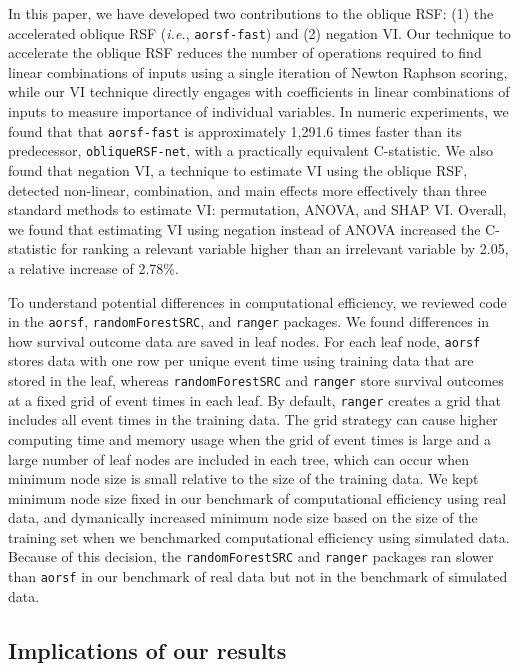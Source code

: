 \documentclass[12pt]{article}\usepackage[]{graphicx}\usepackage[]{xcolor}
\newcommand{\ie}{\textit{i.e.}}
\begin{document}
In this paper, we have developed two contributions to the oblique RSF: (1) the accelerated oblique RSF (\ie, \texttt{aorsf-fast}) and (2) negation VI. Our technique to accelerate the oblique RSF reduces the number of operations required to find linear combinations of inputs using a single iteration of Newton Raphson scoring, while our VI technique directly engages with coefficients in linear combinations of inputs to measure importance of individual variables. In numeric experiments, we found that that \texttt{aorsf-fast} is approximately 1,291.6 times faster than its predecessor, \texttt{obliqueRSF-net}, with a practically equivalent C-statistic. We also found that negation VI, a technique to estimate VI using the oblique RSF, detected non-linear, combination, and main effects more effectively than three standard methods to estimate VI: permutation, ANOVA, and SHAP VI. Overall, we found that estimating VI using negation instead of ANOVA increased the C-statistic for ranking a relevant variable higher than an irrelevant variable by 2.05, a relative increase of 2.78\%.

To understand potential differences in computational efficiency, we reviewed code in the \texttt{aorsf}, \texttt{randomForestSRC}, and \texttt{ranger} packages. We found differences in how survival outcome data are saved in leaf nodes. For each leaf node, \texttt{aorsf} stores data with one row per unique event time using training data that are stored in the leaf, whereas \texttt{randomForestSRC} and \texttt{ranger} store survival outcomes at a fixed grid of event times in each leaf. By default, \texttt{ranger} creates a grid that includes all event times in the training data. The grid strategy can cause higher computing time and memory usage when the grid of event times is large and a large number of leaf nodes are included in each tree, which can occur when minimum node size is small relative to the size of the training data. We kept minimum node size fixed in our benchmark of computational efficiency using real data, and dymanically increased minimum node size based on the size of the training set when we benchmarked computational efficiency using simulated data. Because of this decision, the \texttt{randomForestSRC} and \texttt{ranger} packages ran slower than \texttt{aorsf} in our benchmark of real data but not in the benchmark of simulated data.

\subsection{Implications of our results}
\end{document}
